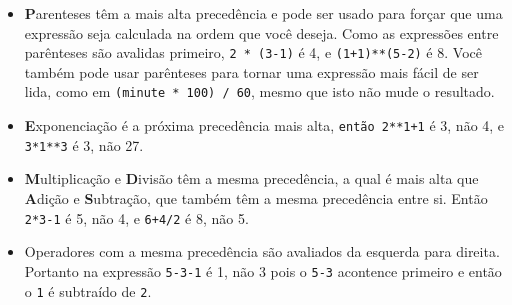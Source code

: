 {{{{{{{{{{{{{

\begin{itemize}

\item {\bf P}arenteses têm a mais alta precedência e pode ser usado 
para forçar que uma expressão seja calculada na ordem que você deseja. Como as 
expressões entre parênteses são avalidas primeiro, {\tt 2 * (3-1)} é 4, 
e {\tt (1+1)**(5-2)} é 8. Você também pode usar parênteses para tornar uma 
expressão mais fácil de ser lida, como em {\tt (minute * 100) / 60}, mesmo 
que isto não mude o resultado.

\item {\bf E}xponenciação é a próxima precedência mais alta,
{\tt então 2**1+1} é 3, não 4, e {\tt 3*1**3} é 3, não 27.

\item {\bf M}ultiplicação e {\bf D}ivisão têm a mesma precedência,
a qual é mais alta que {\bf A}dição e {\bf S}ubtração, que também 
têm a mesma precedência entre si. Então {\tt 2*3-1} é 5, não 4, e 
{\tt6+4/2} é 8, não 5.


\item Operadores com a mesma precedência são avaliados da esquerda para 
direita. Portanto na expressão {\tt 5-3-1} é 1, não 3 pois o 
{\tt 5-3} acontence primeiro e então o {\tt 1} é subtraído de {\tt 2}.

\end{itemize}

}}}}}}}}}}}}}
